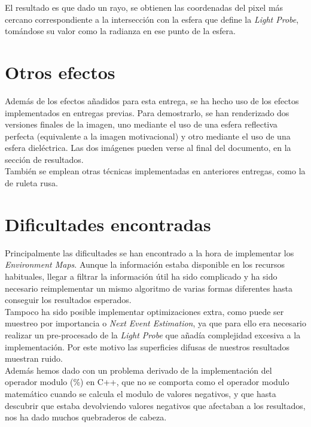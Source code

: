 \documentclass[10pt,oneside,a4paper]{article}
\begin{document}
El resultado es que dado un rayo, se obtienen las coordenadas del pixel más cercano correspondiente a la intersección con la esfera que define la \emph{Light Probe}, tomándose su valor como la radianza en ese punto de la esfera.

\newpage
\section{Otros efectos}
Además de los efectos añadidos para esta entrega, se ha hecho uso de los efectos implementados en entregas previas. Para demostrarlo, se han renderizado dos versiones finales de la imagen, uno mediante el uso de una esfera reflectiva perfecta (equivalente a la imagen motivacional) y otro mediante el uso de una esfera dieléctrica. Las dos imágenes pueden verse al final del documento, en la sección de resultados.\\

También se emplean otras técnicas implementadas en anteriores entregas, como la de ruleta rusa.

\section{Dificultades encontradas}
Principalmente las dificultades se han encontrado a la hora de implementar los \emph{Environment Maps}. Aunque la información estaba disponible en los recursos habituales, llegar a filtrar la información útil ha sido complicado y ha sido necesario reimplementar un mismo algoritmo de varias formas diferentes hasta conseguir los resultados esperados. \\

Tampoco ha sido posible implementar optimizaciones extra, como puede ser muestreo por importancia o \emph{Next Event Estimation}, ya que para ello era necesario realizar un pre-procesado de la \emph{Light Probe} que añadía complejidad excesiva a la implementación. Por este motivo las superficies difusas de nuestros resultados muestran ruido.\\

Además hemos dado con un problema derivado de la implementación del operador modulo (\%) en C++, que no se comporta como el operador modulo matemático cuando se calcula el modulo de valores negativos, y que hasta descubrir que estaba devolviendo valores negativos que afectaban a los resultados, nos ha dado muchos quebraderos de cabeza.

\newpage
\end{document}
